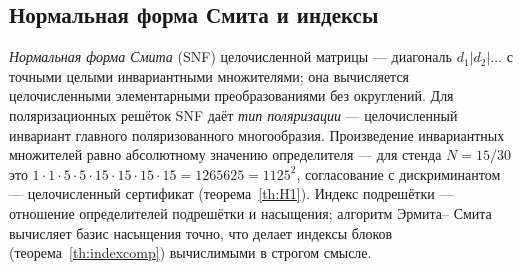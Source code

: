 \subsection{Нормальная форма Смита и индексы}

\emph{Нормальная форма Смита} (SNF) целочисленной матрицы ---
диагональ $d_1|d_2|\dots$ с точными целыми инвариантными
множителями; она вычисляется целочисленными элементарными
преобразованиями без округлений. Для поляризационных решёток SNF
даёт \emph{тип поляризации} --- целочисленный инвариант главного
поляризованного многообразия. Произведение инвариантных множителей
равно абсолютному значению определителя --- для стенда
$N=15/30$ это $1\cdot1\cdot5\cdot5\cdot15\cdot15\cdot15\cdot15
=1265625=1125^2$, согласование с дискриминантом --- целочисленный
сертификат (теорема~\ref{th:H1}). Индекс подрешётки ---
отношение определителей подрешётки и насыщения; алгоритм Эрмита--
Смита вычисляет базис насыщения точно, что делает индексы блоков
(теорема~\ref{th:indexcomp}) вычислимыми в строгом смысле.
